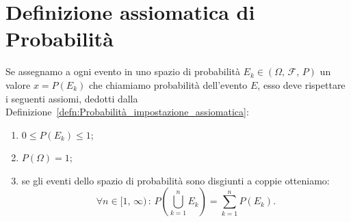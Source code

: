     \section{Definizione assiomatica di Probabilità}
        \begin{defn}
            Se assegnamo a ogni evento in uno spazio di probabilità $E_k \in (\Omega,\,\mathscr{F},\,P)$ un valore $x = P(E_k)$ che chiamiamo probabilità dell'evento $E$, esso deve rispettare i seguenti assiomi, dedotti dalla Definizione~\ref{defn:Probabilità_impostazione_assiomatica}:
            \begin{enumerate}[\indent I)]
                \item $0 \leq P(E_k) \leq 1$;
                \item $P(\Omega) = 1$;
                \item  se gli eventi dello spazio di probabilità sono disgiunti a coppie otteniamo: \[
                \forall n \in [1,\,\infty)\,:\,P(\bigcup_{k=1}^{n} E_k) = \sum_{k=1}^{n} P(E_k)
                .\] 
            \end{enumerate}
        \end{defn}
